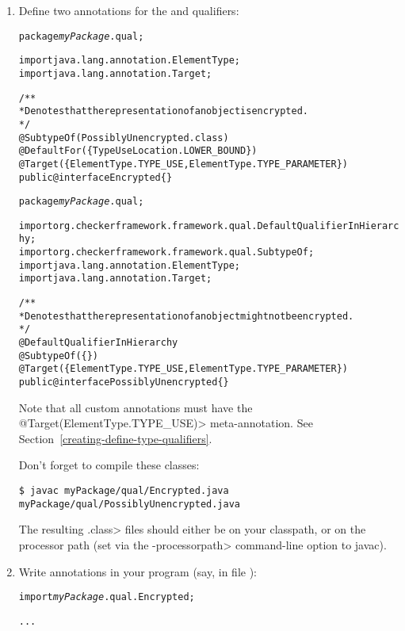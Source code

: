 \begin{enumerate}
\item
Define two annotations for the  and  qualifiers:

\begin{alltt}
package \textit{myPackage}.qual;

import java.lang.annotation.ElementType;
import java.lang.annotation.Target;

/**
 * Denotes that the representation of an object is encrypted.
 */
@SubtypeOf(PossiblyUnencrypted.class)
@DefaultFor(\{TypeUseLocation.LOWER_BOUND\})
@Target(\{ElementType.TYPE_USE, ElementType.TYPE_PARAMETER\})
public @interface Encrypted \{\}
\end{alltt}

\begin{alltt}
package \textit{myPackage}.qual;

import org.checkerframework.framework.qual.DefaultQualifierInHierarchy;
import org.checkerframework.framework.qual.SubtypeOf;
import java.lang.annotation.ElementType;
import java.lang.annotation.Target;

/**
 * Denotes that the representation of an object might not be encrypted.
 */
@DefaultQualifierInHierarchy
@SubtypeOf(\{\})
@Target(\{ElementType.TYPE_USE, ElementType.TYPE_PARAMETER\})
public @interface PossiblyUnencrypted \{\}
\end{alltt}

Note that all custom annotations must have the
\<@Target(ElementType.TYPE\_USE)> meta-annotation.
See Section~\ref{creating-define-type-qualifiers}.

Don't forget to compile these classes:

\begin{Verbatim}
$ javac myPackage/qual/Encrypted.java myPackage/qual/PossiblyUnencrypted.java
\end{Verbatim}

The resulting \<.class> files should either be on your classpath, or on the
processor path (set via the \<-processorpath> command-line option to javac).

\item
  Write  annotations in your program (say, in file
  ):

\begin{alltt}
import \textit{myPackage}.qual.Encrypted;

...


\end{alltt}
\end{enumerate}
